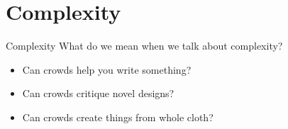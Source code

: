 \documentclass[presentation]{subfiles}
\begin{document}
\section{Complexity}

\begin{frame}{Complexity}
  What do we mean when we talk about complexity?
  \begin{itemize}
    \item<1-> Can crowds help you write something?\\
    \scriptsize{
      \textcite{bernsteinSoylent,Kim:2014:CSI:2556288.2556986,Nebeling:2016:WCW:2858036.2858169}
    }
    \item<2-> Can crowds critique novel designs?\\
    \scriptsize{
      \textcite{yuanAlmost,fuge2014analysis}
    }
    \item<3-> Can crowds create things from whole cloth?\\
    \scriptsize{
      \textcite{KimStoria,Kim2017,Hahn:2016:KAB:2858036.2858364,Lasecki:2014:LSR:2661334.2661352}
    }
  \end{itemize}
\end{frame}
\end{document}
